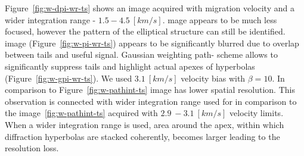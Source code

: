 Figure~\ref{fig:w-dpi-wr-ts} shows an image acquired with  migration velocity and a wider integration
range - $1.5 - 4.5\ [km/s]$.  mage appears to be much less focused, however the pattern of the elliptical
structure can still be identified.  image (Figure~\ref{fig:w-pi-wr-ts})
appears to be significantly blurred due to overlap between tails and useful signal.
Gaussian weighting path-
scheme allows to significantly suppress tails and highlight actual apexes of hyperbolas (Figure~\ref{fig:w-gpi-wr-ts}).
We used $3.1\ [km/s]$ velocity bias with $\beta=10$. In comparison to Figure~\ref{fig:w-pathint-ts} 
 image
has lower spatial resolution. This observation is connected with wider integration range used for 
in comparison to the image~\ref{fig:w-pathint-ts} acquired with $2.9\ - 3.1\ [km/s]$ velocity limits. When a
wider integration range is used, area around the apex, within which diffraction hyperbolas are stacked coherently,
becomes larger leading to the resolution loss.





